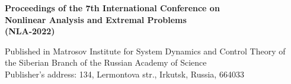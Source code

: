 \documentclass[12pt,final]{llncs}
\begin{document}
 \begin{englisharticle}

\end{englisharticle}


 \begin{englisharticle}

\end{englisharticle}







 \begin{englisharticle}

\end{englisharticle}





























\newpage

\newpage
\thispagestyle{empty}
 \begin{englisharticle}
\begin{center}
${}$
\vfill




{\bf  Proceedings of the 7th International Conference on\\[0.3em]
 Nonlinear Analysis and Extremal Problems\\[0.3em]  (NLA-2022)}

\vfill\vfill



Published in Matrosov Institute for System Dynamics and Control Theory  
of\\ the Siberian Branch of the Russian Academy of Science\\[0.5em]

Publisher's address: 134, Lermontova str., Irkutsk, Russia, 664033

\end{center}

 \end{englisharticle}

\iffalse
\clearpage
\addtocmark[2]{Author Index} %
\renewcommand{\indexname}{Author Index}
\clearpage
\addtocmark[2]{Subject Index} %
\markboth{Subject Index}{Subject Index}
\renewcommand{\indexname}{Subject Index}
%
\fi
\end{document}
